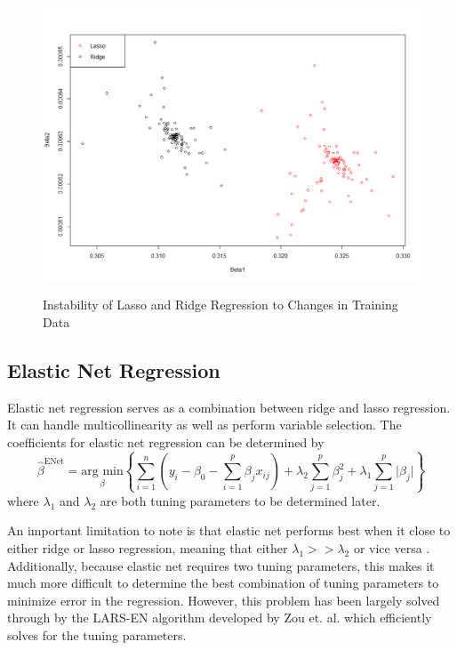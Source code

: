 \documentclass{article}
\newcommand{\argmin}[1]{\underset{\beta}{\text{arg min}}}
\begin{document}
\begin{figure}[!ht]
	\centering
	\caption{Instability of Lasso and Ridge Regression to Changes in Training Data}
	\includegraphics[width = 0.7\linewidth]{images/lasso-vs-ridge-instability.png}
	\label{fig:lasso-and-ridge-instability}
\end{figure}

\subsection{Elastic Net Regression}
Elastic net regression serves as a combination between ridge and lasso regression. It can handle  multicollinearity as well as perform variable selection. The coefficients for elastic net regression can be determined by 
\begin{equation}
	\hat{\beta}^{\text{ENet}}=\argmin{\beta}\left\{ \sum\limits_{i = 1}^n \left( y_i - \beta_0 - \sum\limits_{i = 1}^p \beta_j x_{ij} \right) + \lambda_2\sum\limits_{j = 1}^p \beta_j^2 + \lambda_1\sum\limits_{j = 1}^p \vert \beta_j \vert \right\}
\end{equation}
where $\lambda_1$ and $\lambda_2$ are both tuning parameters to be determined later.

An important limitation to note is that elastic net performs best when it close to either ridge or lasso regression, meaning that either $\lambda_1 >> \lambda_2$ or vice versa \cite{zou2005regularization}. Additionally, because elastic net requires two tuning parameters, this makes it much more difficult to determine the best combination of tuning parameters to minimize error in the regression. However, this problem has been largely solved through by the LARS-EN algorithm developed by Zou et. al. which efficiently solves for the tuning parameters.
\end{document}
